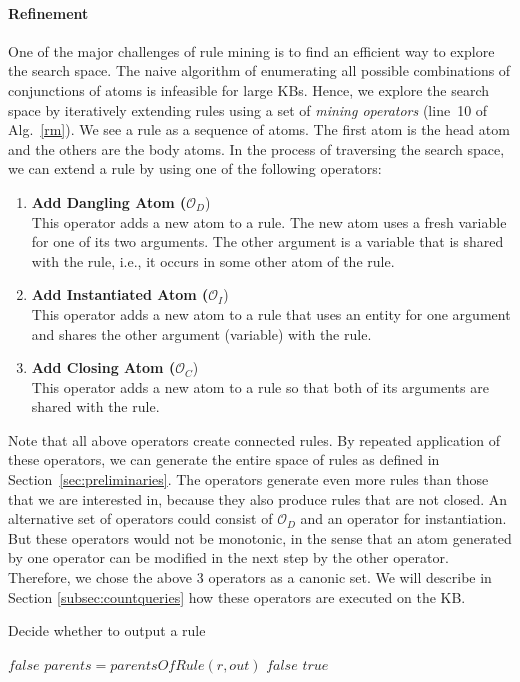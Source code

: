 \paragraph{Refinement}\label{subsubsec:refinement}
One of the major challenges of rule mining is to find an efficient way to explore the search space.
The naive algorithm of enumerating all possible combinations of conjunctions of atoms is infeasible for large KBs.
Hence, we explore the search space by iteratively extending rules using a set of \emph{mining operators} (line~10 of Alg.~\ref{rm}).
We see a rule as a sequence of atoms. The first atom is the head atom and the others are the body atoms.
In the process of traversing the search space, we can extend a rule by using one of the following operators:
\begin{enumerate}
\item \textbf{Add Dangling Atom ($\mathcal{O}_D$})\\
This operator adds a new atom to a rule. The new atom uses a fresh variable for one of its two arguments. The other argument is a variable
that is shared with the rule, i.e., it occurs in some other atom of the rule.
\item \textbf{Add Instantiated Atom ($\mathcal{O}_I$})\\
This operator adds a new atom to a rule that uses an entity for one argument and shares the other argument (variable) with the rule.
\item \textbf{Add Closing Atom ($\mathcal{O}_C$})\\
This operator adds a new atom to a rule so that both of its arguments are shared with the rule.
\end{enumerate}
Note that all above operators create connected rules.
By repeated application of these operators, we can generate the entire space of rules as defined in Section~\ref{sec:preliminaries}.
The operators generate even more rules than those that we are interested in, because they also produce rules that are not closed.
An alternative set of operators could consist of $\mathcal{O}_D$ and an operator for instantiation.
But these operators would not be monotonic, in the sense that an atom generated by one operator can be modified in the next step by the other operator.
Therefore, we chose the above 3 operators as a canonic set. We will describe in Section \ref{subsec:countqueries} how these operators are executed on the KB.

\begin{algorithm}
\caption{Decide whether to output a rule}
\label{pfo}
\begin{algorithmic}[1]
      \State \Return $false$
    \EndIf
    \State $parents = parentsOfRule(r, out)$
	\State \Return $false$
      \EndIf
    \EndFor
    \State \Return $true$
\EndFunction
\end{algorithmic}
\end{algorithm}

